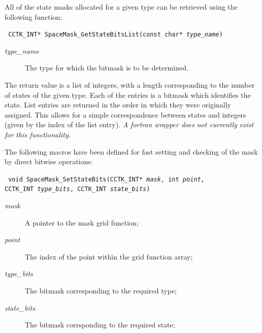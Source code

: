 \documentclass{article}
\begin{document}
All of the state masks allocated for a given type can be retrieved
using the following function:

\indent\parbox{\linewidth}{
\vspace{\baselineskip}\noindent\texttt{
CCTK\_INT* SpaceMask\_GetStateBitsList(const char* \emph{type\_name})
}\\
\hspace*{10mm}\parbox{\linewidth}{
\begin{description}
  \item[\emph{type\_name}] The type for which the bitmask is to be
  determined.
\end{description}
}}

The return value is a list of integers, with a length corresponding to
the number of states of the given type. Each of the entries is a
bitmask which identifies the state. List entries are returned in the
order in which they were originally assigned. This allows for a simple
correspondence between states and integers (given by the index of the
list entry). \emph{A fortran wrapper does not currently exist for this
functionality.}

The following macros have been defined for fast setting and checking
of the mask by direct bitwise operations:

\indent\parbox{\linewidth}{
\vspace{\baselineskip}\noindent\texttt{
void SpaceMask\_SetStateBits(CCTK\_INT* \emph{mask}, int \emph{point},
  \\\hspace*{10mm}
  CCTK\_INT \emph{type\_bits}, CCTK\_INT \emph{state\_bits})
}\\
\hspace*{10mm}\parbox{\linewidth}{
\begin{description}
  \item[\emph{mask}] A pointer to the mask grid function;
  \item[\emph{point}] The index of the point within the grid function
    array;
  \item[\emph{type\_bits}] The bitmask corresponding to the required
    type;
  \item[\emph{state\_bits}] The bitmask corrsponding to the required
    state;
\end{description}
}}
\end{document}
